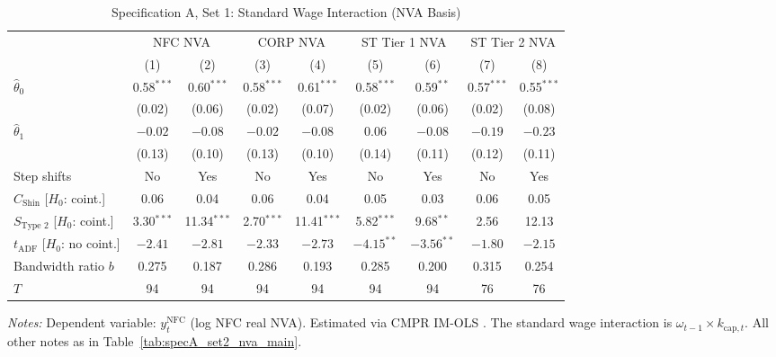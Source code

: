 \begin{table}[htbp]
	\centering
	\caption{Specification A, Set 1: Standard Wage Interaction (NVA Basis)}
	\label{tab:specA_set1_nva_app}
	\small
	\begin{tabular}{@{}lcccccccc@{}}
		\toprule
		& \multicolumn{2}{c}{NFC NVA} & \multicolumn{2}{c}{CORP NVA} & \multicolumn{2}{c}{ST Tier 1 NVA} & \multicolumn{2}{c}{ST Tier 2 NVA} \\
		\cmidrule(lr){2-3} \cmidrule(lr){4-5} \cmidrule(lr){6-7} \cmidrule(lr){8-9}
		& (1) & (2) & (3) & (4) & (5) & (6) & (7) & (8) \\
		\midrule
		$\hat{\theta}_0$ & 0.58$^{***}$ & 0.60$^{***}$ & 0.58$^{***}$ & 0.61$^{***}$ & 0.58$^{***}$ & 0.59$^{**}$ & 0.57$^{***}$ & 0.55$^{***}$ \\
		& (0.02) & (0.06) & (0.02) & (0.07) & (0.02) & (0.06) & (0.02) & (0.08) \\
		$\hat{\theta}_1$ & $-0.02$ & $-0.08$ & $-0.02$ & $-0.08$ & 0.06 & $-0.08$ & $-0.19$ & $-0.23$ \\
		& (0.13) & (0.10) & (0.13) & (0.10) & (0.14) & (0.11) & (0.12) & (0.11) \\
		\midrule
		Step shifts & No & Yes & No & Yes & No & Yes & No & Yes \\
		$C_{\text{Shin}}$ [$H_0$: coint.] & 0.06 & 0.04 & 0.06 & 0.04 & 0.05 & 0.03 & 0.06 & 0.05 \\
		$S_{\text{Type 2}}$ [$H_0$: coint.] & 3.30$^{***}$ & 11.34$^{***}$ & 2.70$^{***}$ & 11.41$^{***}$ & 5.82$^{***}$ & 9.68$^{**}$ & 2.56 & 12.13 \\
		$t_{\text{ADF}}$ [$H_0$: no coint.] & $-2.41$ & $-2.81$ & $-2.33$ & $-2.73$ & $-4.15^{**}$ & $-3.56^{**}$ & $-1.80$ & $-2.15$ \\
		Bandwidth ratio $b$ & 0.275 & 0.187 & 0.286 & 0.193 & 0.285 & 0.200 & 0.315 & 0.254 \\
		$T$ & 94 & 94 & 94 & 94 & 94 & 94 & 76 & 76 \\
		\bottomrule
	\end{tabular}
	\begin{minipage}{\textwidth}
		\scriptsize
		\textit{Notes:} Dependent variable: $y_t^{\text{NFC}}$ (log NFC real NVA). Estimated via CMPR IM-OLS \citep{VogelsangWagner2024}. The standard wage interaction is $\omega_{t-1} \times k_{\text{cap},t}$. All other notes as in Table~\ref{tab:specA_set2_nva_main}.
	\end{minipage}
\end{table}

